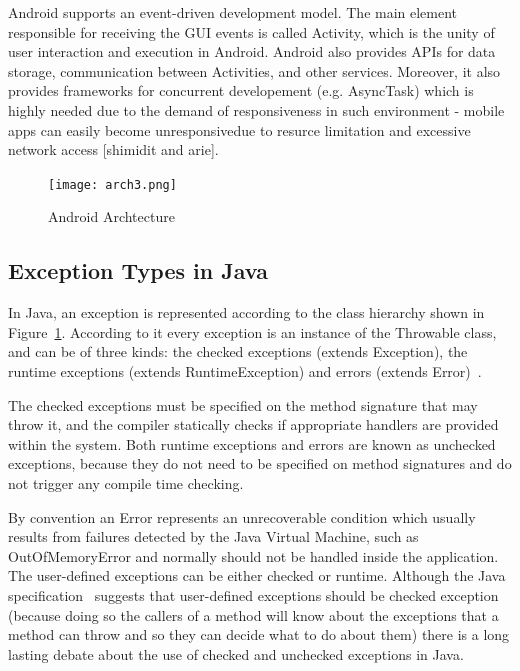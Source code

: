\documentclass[conference]{IEEEtran}
\begin{document}
Android supports an event-driven development model. The main element responsible for 
receiving the GUI events is called Activity, which is the unity of user interaction and execution in
Android. Android also provides APIs for data storage, communication between Activities, 
and other services. Moreover, it also provides frameworks for concurrent developement (e.g. AsyncTask) 
which is highly needed due to the demand of responsiveness in such environment  - 
mobile apps can easily become unresponsivedue to resurce limitation and excessive
 network access [shimidit and arie].

\begin{figure} \centering \texttt{[image: arch3.png]}
  \caption{Android Archtecture} \label{fig:exchier} \end{figure}

\subsection{Exception Types in Java} \label{sec:extypes}

In Java, an exception is represented according to the class hierarchy shown in
Figure~\ref{fig:exchier}.  According to it every exception is an
instance of the Throwable class, and can be of three kinds: the checked exceptions
(extends Exception), the runtime exceptions (extends RuntimeException) and errors
(extends Error)~\cite{gosling2000java}. 

The checked exceptions must be specified on the method signature that may throw it, 
and the compiler statically checks if appropriate handlers are provided within the system.
Both runtime exceptions and errors are known as unchecked exceptions, because 
they do not need to be specified on method signatures and do not trigger any 
compile time checking.

By convention an Error represents an unrecoverable condition which usually results
from failures detected by the Java Virtual Machine, such as OutOfMemoryError and
normally should not be handled inside the application. The user-defined exceptions 
can be either checked or runtime. Although the Java specification~\cite{gosling2000java} 
suggests that user-defined exceptions should be checked exception (because doing so 
the callers of a method will know about the exceptions that a method can throw and so 
they can decide what to do about them) there is a long lasting debate about the use of 
checked and unchecked exceptions in Java. 
\end{document}
